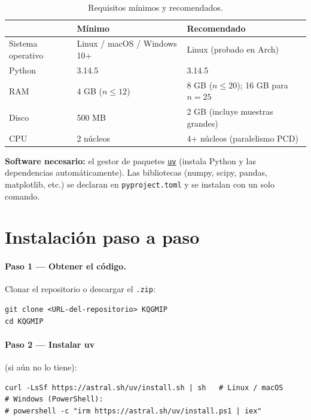 \documentclass[11pt,letterpaper]{article}
\begin{document}
\begin{table}[H]
	\centering\small
	\caption{Requisitos mínimos y recomendados.}
	\begin{tabular}{@{}lll@{}}
		\toprule
		                  & Mínimo                      & Recomendado                            \\
		\midrule
		Sistema operativo & Linux / macOS / Windows 10+ & Linux (probado en Arch)                \\
		Python            & 3.14.5                      & 3.14.5                                 \\
		RAM               & 4 GB ($n\le 12$)            & 8 GB ($n\le 20$); 16 GB para $n=25$    \\
		Disco             & 500 MB                      & 2 GB (incluye muestras grandes)        \\
		CPU               & 2 núcleos                   & 4+ núcleos (paralelismo PCD)           \\
		\bottomrule
	\end{tabular}
\end{table}

\noindent\textbf{Software necesario:} el gestor de paquetes
\href{https://github.com/astral-sh/uv}{\texttt{uv}} (instala Python y las
dependencias automáticamente). Las bibliotecas (numpy, scipy, pandas, matplotlib,
etc.) se declaran en \texttt{pyproject.toml} y se instalan con un solo comando.

\section{Instalación paso a paso}

\paragraph{Paso 1 — Obtener el código.} Clonar el repositorio o descargar el
\texttt{.zip}:
\begin{lstlisting}[style=sh]
git clone <URL-del-repositorio> KQGMIP
cd KQGMIP
\end{lstlisting}

\paragraph{Paso 2 — Instalar uv} (si aún no lo tiene):
\begin{lstlisting}[style=sh]
curl -LsSf https://astral.sh/uv/install.sh | sh   # Linux / macOS
# Windows (PowerShell):
# powershell -c "irm https://astral.sh/uv/install.ps1 | iex"
\end{lstlisting}
\end{document}
